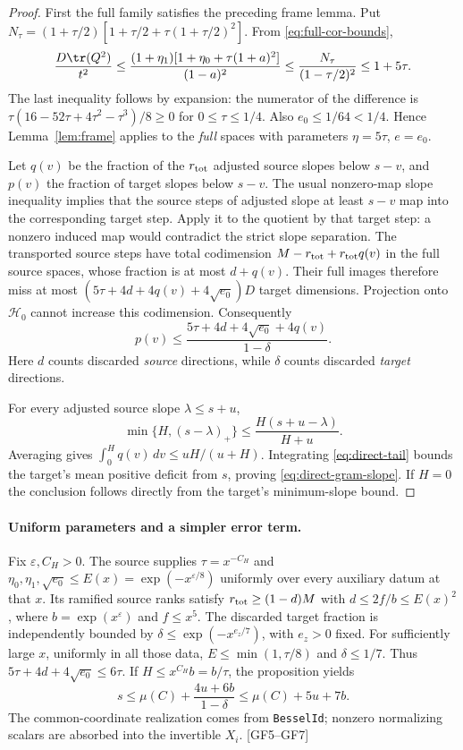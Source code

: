 \begin{proof}
First the full family satisfies the preceding frame lemma.  Put
$N_\tau=(1+\tau/2)[1+\tau/2+\tau(1+\tau/2)^2]$.  From
\eqref{eq:full-cor-bounds},
\[
\frac{D\tr(Q^2)}{t^2}
\le\frac{(1+\eta_1)[1+\eta_0+\tau(1+a)^2]}{(1-a)^2}
\le\frac{N_\tau}{(1-\tau/2)^2}\le1+5\tau.
\]
The last inequality follows by expansion: the numerator of the difference is
$\tau(16-52\tau+4\tau^2-\tau^3)/8\ge0$ for $0\le\tau\le1/4$.
Also $e_0\le1/64<1/4$.  Hence Lemma~\ref{lem:frame} applies to the
\emph{full} spaces with parameters $\eta=5\tau$, $e=e_0$.

Let $q(v)$ be the fraction of the $r_{\rm tot}$ adjusted source slopes below $s-v$,
and $p(v)$ the fraction of target slopes below $s-v$.  The usual nonzero-map
slope inequality implies that the source steps of adjusted slope at least
$s-v$ map into the corresponding target step.  Apply it to the quotient
by that target step: a nonzero induced map would contradict the strict
slope separation.  The transported source steps have total codimension
$M-r_{\rm tot}+r_{\rm tot}q(v)$ in the full source spaces, whose fraction is at most $d+q(v)$.
Their full images therefore miss at most
$(5\tau+4d+4q(v)+4\sqrt{e_0})D$ target dimensions.
Projection onto $\mathcal H_0$ cannot increase this codimension.
Consequently
\begin{equation}\label{eq:direct-tail}
p(v)\le\frac{5\tau+4d+4\sqrt{e_0}+4q(v)}{1-\delta}.
\end{equation}
Here $d$ counts discarded \emph{source} directions, while $\delta$ counts
discarded \emph{target} directions.

For every adjusted source slope $\lambda\le s+u$,
\[
\min\{H,(s-\lambda)_+\}
\le\frac{H(s+u-\lambda)}{H+u}.
\]
Averaging gives $\int_0^Hq(v)\,dv\le uH/(u+H)$.
Integrating \eqref{eq:direct-tail} bounds the target's mean positive deficit
from $s$, proving \eqref{eq:direct-gram-slope}.  If $H=0$ the conclusion
follows directly from the target's minimum-slope bound.
\end{proof}

\paragraph{Uniform parameters and a simpler error term.}
Fix $\varepsilon,C_H>0$.  The source supplies $\tau=x^{-C_H}$ and
$\eta_0,\eta_1,\sqrt{e_0}\le E(x)=\exp(-x^{\varepsilon/8})$ uniformly
over every auxiliary datum at that $x$.  Its ramified source ranks satisfy
$r_{\rm tot}\ge(1-d)M$ with $d\le2f/b\le E(x)^2$, where
$b=\exp(x^\varepsilon)$ and $f\le x^5$.
The discarded target fraction is independently bounded by
$\delta\le\exp(-x^{e_z/7})$, with $e_z>0$ fixed.
For sufficiently large $x$, uniformly in all those data,
$E\le\min(1,\tau/8)$ and $\delta\le1/7$.
Thus $5\tau+4d+4\sqrt{e_0}\le6\tau$.
If $H\le x^{C_H}b=b/\tau$, the proposition yields
\begin{equation}\label{eq:direct-frame-final}
s\le\mu(C)+\frac{4u+6b}{1-\delta}
\le\mu(C)+5u+7b.
\end{equation}
The common-coordinate realization comes from \texttt{BesselId}; nonzero
normalizing scalars are absorbed into the invertible $X_i$.
\textsf{[GF5--GF7]}

